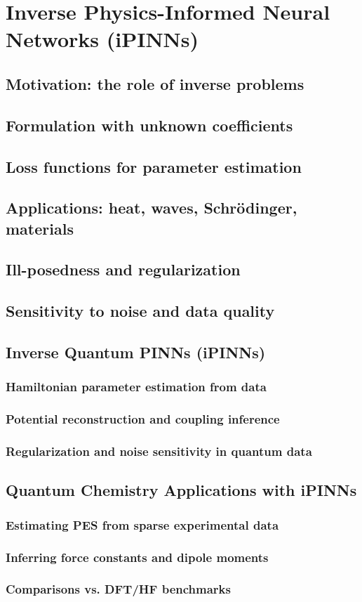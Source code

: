 ﻿\chapter{Inverse Physics-Informed Neural Networks (iPINNs)}
\section{Motivation: the role of inverse problems}

\section{Formulation with unknown coefficients}

\section{Loss functions for parameter estimation}

\section{Applications: heat, waves, Schrödinger, materials}

\section{Ill-posedness and regularization}

\section{Sensitivity to noise and data quality}
\section{Inverse Quantum PINNs (iPINNs)} %
\subsection{Hamiltonian parameter estimation from data} %
\subsection{Potential reconstruction and coupling inference} %
\subsection{Regularization and noise sensitivity in quantum data} %

\section{Quantum Chemistry Applications with iPINNs} %
\subsection{Estimating PES from sparse experimental data} %
\subsection{Inferring force constants and dipole moments} %
\subsection{Comparisons vs. DFT/HF benchmarks} %

